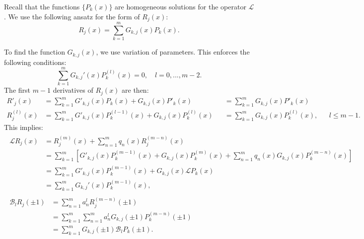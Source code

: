 \documentclass{article}
\begin{document}
Recall that the functions $\{ P_k(x) \}$ are homogeneous solutions for the operator $\mathcal{L}$.
We use the following ansatz for the form of $R_j(x)$:
\begin{equation} \label{ansatz}
R_j(x) = \sum_{k=1}^m G_{k,j}(x) P_k(x) .
\end{equation}

To find the function $G_{k,j}(x)$, we use variation of parameters.
This enforces the following conditions:
\begin{equation} \label{variation of parameters}
\sum_{k=1}^m G_{k,j}'(x) P_k^{(l)}(x) = 0, \quad l = 0,...,m-2 .
\end{equation}
The first $m-1$ derivatives of $R_j(x)$ are then:
\begin{equation}
\begin{aligned}
R'_j(x) & = \sum_{k=1}^m G'_{k,j}(x) P_k(x) + G_{k,j}(x) P'_k(x) && = \sum_{k=1}^m G_{k,j}(x) P'_k(x) \\
R_j^{(l)}(x) & = \sum_{k=1}^m G'_{k,j}(x) P_k^{(l-1)}(x) + G_{k,j}(x) P_k^{(l)}(x) && = \sum_{k=1}^m G_{k,j}(x) P_k^{(l)}(x), && l \leq m-1 .
\end{aligned}
\end{equation}
This implies:
\begin{align} \label{L on R}
\begin{split}
\mathcal{L} R_j(x) & = R_j^{(m)}(x) + \sum_{n=1}^m q_n(x) R_j^{(m-n)}(x) \\
& = \sum_{k=1}^m \left [ G'_{k,j}(x) P_k^{(m-1)}(x) + G_{k,j}(x) P_k^{(m)}(x) + \sum_{n=1}^m q_n(x) G_{k,j}(x) P_k^{(m-n)}(x) \right ] \\
& = \sum_{k=1}^m G'_{k,j}(x) P_k^{(m-1)}(x) + G_{k,j}(x) \mathcal{L} P_k(x) \\
& = \sum_{k=1}^m G_{k,j}'(x) P_k^{(m-1)}(x) ,
\end{split} \\
\begin{split} \label{B on R}
\mathcal{B}_l R_j(\pm 1) & = \sum_{n=1}^m a_n^l R_j^{(m-n)}(\pm1) \\
& = \sum_{k=1}^m \sum_{n=1}^m a_n^l G_{k,j}(\pm1) P_k^{(m-n)}(\pm1) \\
& = \sum_{k=1}^m G_{k,j}(\pm1) \mathcal{B}_l P_k(\pm1) .
\end{split}
\end{align}
\end{document}
